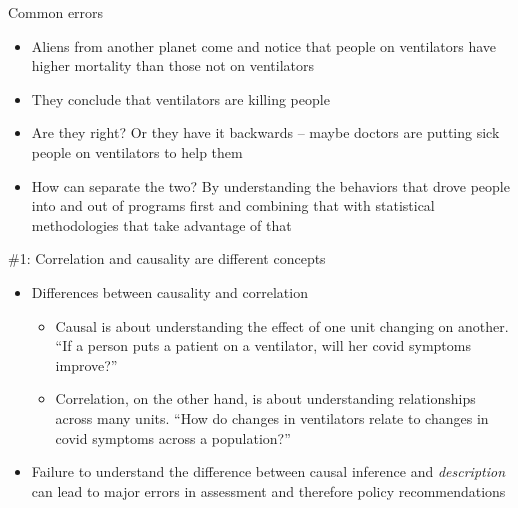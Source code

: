 \documentclass{beamer}
\begin{document}


\begin{frame}{Common errors}

  \begin{itemize}
    \item Aliens from another planet come and notice that people on ventilators have higher mortality than those not on ventilators
    \item They conclude that ventilators are killing people
    \item Are they right?  Or  they have it backwards -- maybe doctors are putting sick people on ventilators to help them
    \item How can separate the two?  By understanding the behaviors that drove people into and out of programs first and combining that with statistical methodologies that take advantage of that
  \end{itemize}

\end{frame}

\begin{frame}{\#1: Correlation and causality are different concepts}

  \begin{itemize}
  	\item Differences between causality and correlation
		\begin{itemize}
	    \item Causal is about understanding the effect of one unit changing on another. ``If a person  puts a patient on a ventilator, will her covid symptoms improve?''
	    \item Correlation, on the other hand, is about understanding relationships across many units. ``How do changes in ventilators relate to changes in covid symptoms across a population?''
	    	\end{itemize}
	\item Failure to understand the difference between causal inference and \emph{description} can lead to major errors in assessment and therefore policy recommendations
  \end{itemize}  
\end{frame}
\end{document}
